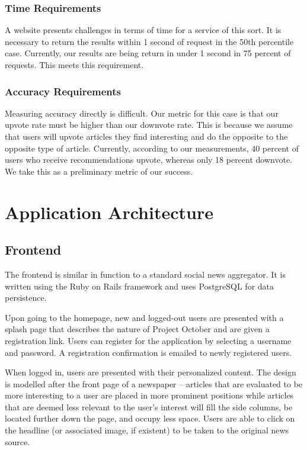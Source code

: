 \documentclass[11pt,letterpaper,titlepage]{article}
\begin{document}
\subsubsection{Time Requirements}
A website presents challenges in terms of time for a service of this sort.  It
is necessary to return the results within 1 second of request in the 50th
percentile case.  Currently, our results are being return in under 1 second in
75 percent of requests. This meets this requirement.
\subsubsection{Accuracy Requirements}
Measuring accuracy directly is difficult.  Our metric for this case is that our
upvote rate must be higher than our downvote rate.  This is because we assume
that users will upvote articles they find interesting and do the opposite to the
opposite type of article. Currently, according to our measurements, 40 percent
of users who receive recommendations upvote, whereas only 18 percent downvote.
We take this as a preliminary metric of our success.

\section{Application Architecture}
\subsection{Frontend}
The frontend is similar in function to a standard social news aggregator.
It is written using the Ruby on Rails framework\cite{rubyonrails} and uses PostgreSQL for data persistence.

Upon going to the homepage, new and logged-out users are presented with a splash page that describes the nature of Project October and are given a registration link.
Users can register for the application by selecting a username and password.
A registration confirmation is emailed to newly registered users.

When logged in, users are presented with their personalized content.
The design is modelled after the front page of a newspaper -- articles that are evaluated to be more interesting to a user are placed in more prominent positions while articles that are deemed less relevant to the user's interest will fill the side columns, be located further down the page, and occupy less space.
Users are able to click on the headline (or associated image, if existent) to be taken to the original news source.
\end{document}
